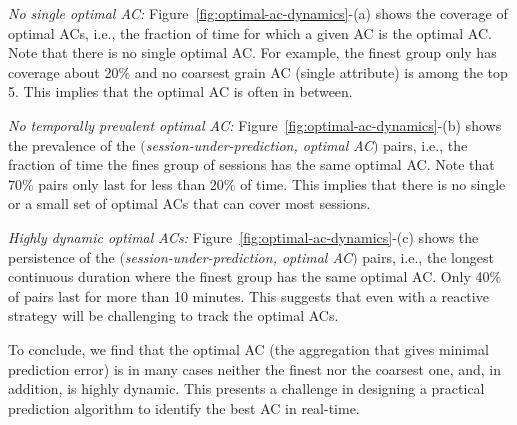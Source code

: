  
\begin{packeditemize}
	\item {\it No single optimal AC:} Figure~\ref{fig:optimal-ac-dynamics}-(a) shows the coverage of optimal ACs, i.e., the fraction of time for which a given AC is the optimal AC. Note that there is no single optimal AC. For example, the finest group only has coverage about 20\% and no coarsest grain AC (single attribute) is among the top 5. This implies that the optimal AC is often in between.
	\item {\it No temporally prevalent optimal AC:} Figure~\ref{fig:optimal-ac-dynamics}-(b) shows the prevalence of the $($\emph{session-under-prediction, optimal AC}$)$ pairs, i.e., the fraction of time the fines group of sessions has the same optimal AC. Note that $70\%$ pairs only last for less than $20\%$ of time. This implies that there is no single or a small set of optimal ACs that can cover most sessions.
	\item {\it Highly dynamic optimal ACs:} Figure~\ref{fig:optimal-ac-dynamics}-(c) shows the persistence of the $($\emph{session-under-prediction, optimal AC}$)$ pairs, i.e., the longest continuous duration where the finest group has the same optimal AC. Only 40\% of pairs last for more than 10 minutes. This suggests that even with a reactive strategy will be challenging to track the optimal ACs.
\end{packeditemize}

To conclude, we find that the optimal AC (the aggregation that gives minimal prediction error) is in many cases neither the finest nor the coarsest one, and, in addition, is highly dynamic. This presents a challenge in designing a practical prediction algorithm to identify the best AC in real-time.

